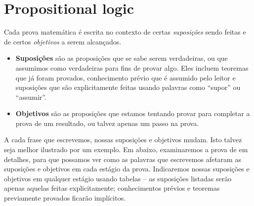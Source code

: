 \section{Propositional logic}

Cada prova matemática é escrita no contexto de certas \textit{suposições} sendo feitas e de certos \textit{objetivos} a serem alcançados.

\begin{itemize}
\item \textbf{Suposições} são as proposições que se sabe serem verdadeiras, ou que assumimos como verdadeiras para fins de provar algo. Eles incluem teoremas que já foram provados, conhecimento prévio que é assumido pelo leitor e suposições que são explicitamente feitas usando palavras como “supor” ou “assumir”.
\item \textbf{Objetivos} são as proposições que estamos tentando provar para completar a prova de um resultado, ou talvez apenas um passo na prova.
\end{itemize}

A cada frase que escrevemos, nossas suposições e objetivos mudam. Isto talvez seja melhor ilustrado por um exemplo. Em  abaixo, examinaremos a prova de  em detalhes, para que possamos ver como as palavras que escrevemos afetaram as suposições e objetivos em cada estágio da prova. Indicaremos nossas suposições e objetivos em qualquer estágio usando tabelas – as suposições listadas serão apenas aquelas feitas explicitamente; conhecimentos prévios e teoremas previamente provados ficarão implícitos.

